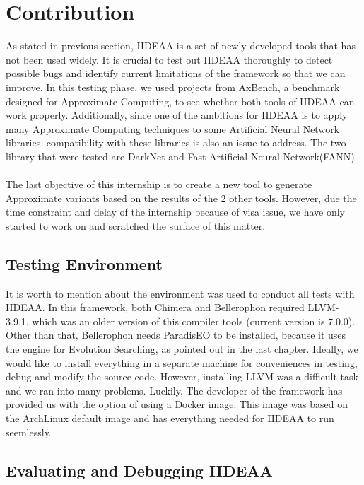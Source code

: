 \chapter{Contribution}

As stated in previous section, IIDEAA is a set of newly developed tools that has not been used widely. It is crucial to test out IIDEAA thoroughly to detect possible bugs and identify current limitations of the framework so that we can improve. In this testing phase, we used projects from AxBench, a benchmark designed for Approximate Computing, to see whether both tools of IIDEAA can work properly. Additionally, since one of the ambitions for IIDEAA is to apply many Approximate Computing techniques to some Artificial Neural Network libraries, compatibility with these libraries is also an issue to address. The two library that were tested are DarkNet and Fast Artificial Neural Network(FANN). \\
~\\
The last objective of this internship is to create a new tool to generate Approximate variants based on the results of the 2 other tools. However, due the time constraint and delay of the internship because of visa issue, we have only started to work on and scratched the surface of this matter.\\

\section{Testing Environment}

It is worth to mention about the environment was used to conduct all tests with IIDEAA. In this framework, both Chimera and Bellerophon required LLVM-3.9.1, which was an older version of this compiler tools (current version is 7.0.0). Other than that, Bellerophon needs ParadisEO to be installed, because it uses the engine for Evolution Searching, as pointed out in the last chapter. Ideally, we would like to install everything in a separate machine for conveniences in testing, debug and modify the source code. However, installing LLVM was a difficult task and we ran into many problems. Luckily, The developer of the framework has provided us with the option of using a Docker image. This image was based on the ArchLinux default image and has everything needed for IIDEAA to run seemlessly.\\
\vspace*{3cm}

\section{Evaluating and Debugging IIDEAA}

